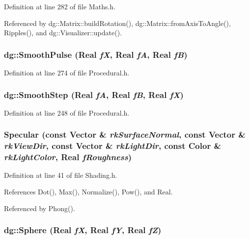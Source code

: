 Definition at line 282 of file Maths.h.

Referenced by dg::Matrix::build\-Rotation(), dg::Matrix::from\-Axis\-To\-Angle(), Ripples(), and dg::Visualizer::update().
\subsubsection{ dg::Smooth\-Pulse ({\bf Real} {\em f\-X}, {\bf Real} {\em f\-A}, {\bf Real} {\em f\-B})\hspace{0.3cm}{\tt  [inline]}}\label{namespacedg_a159}




Definition at line 274 of file Procedural.h.
\subsubsection{ dg::Smooth\-Step ({\bf Real} {\em f\-A}, {\bf Real} {\em f\-B}, {\bf Real} {\em f\-X})\hspace{0.3cm}{\tt  [inline]}}\label{namespacedg_a156}




Definition at line 248 of file Procedural.h.
\subsubsection{ Specular (const {\bf Vector} \& {\em rk\-Surface\-Normal}, const {\bf Vector} \& {\em rk\-View\-Dir}, const {\bf Vector} \& {\em rk\-Light\-Dir}, const {\bf Color} \& {\em rk\-Light\-Color}, {\bf Real} {\em f\-Roughness})\hspace{0.3cm}{\tt  [inline]}}\label{namespacedg_a174}




Definition at line 41 of file Shading.h.

References Dot(), Max(), Normalize(), Pow(), and Real.

Referenced by Phong().
\subsubsection{ dg::Sphere ({\bf Real} {\em f\-X}, {\bf Real} {\em f\-Y}, {\bf Real} {\em f\-Z})}\label{namespacedg_a67}




